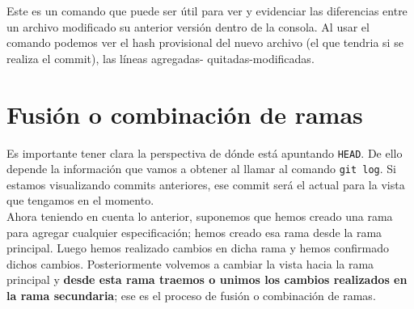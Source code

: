 Este es un comando que puede ser útil para ver y evidenciar las diferencias entre un archivo modificado su anterior versión dentro de la consola. Al usar el comando podemos ver el hash provisional del nuevo archivo (el que tendria si se realiza el commit), las líneas agregadas- quitadas-modificadas.

\section{Fusión o combinación de ramas}
Es importante tener clara la perspectiva de dónde está apuntando \texttt{HEAD}. De ello depende la información que vamos a obtener al llamar al comando \texttt{git log}. Si estamos visualizando commits anteriores, ese commit será el actual para la vista que tengamos en el momento. \\
Ahora teniendo en cuenta lo anterior, suponemos que hemos creado una rama para agregar cualquier especificación; hemos creado esa rama desde la rama principal. Luego hemos realizado cambios en dicha rama y hemos confirmado dichos cambios. Posteriormente volvemos a cambiar la vista hacia la rama principal y \textbf{desde esta rama traemos o unimos los cambios realizados en la rama secundaria}; ese es el proceso de fusión o combinación de ramas. 


